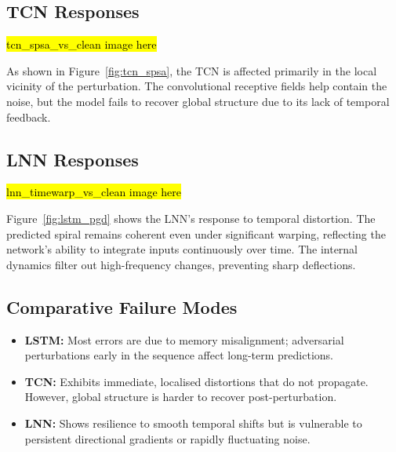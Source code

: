 \subsection{TCN Responses}

\hl{tcn\_spsa\_vs\_clean image here}


As shown in Figure~\ref{fig:tcn_spsa}, the TCN is affected primarily in the local vicinity of the perturbation. The convolutional receptive fields help contain the noise, but the model fails to recover global structure due to its lack of temporal feedback.

\subsection{LNN Responses}

\hl{lnn\_timewarp\_vs\_clean image here}


Figure~\ref{fig:lstm_pgd} shows the LNN's response to temporal distortion. The predicted spiral remains coherent even under significant warping, reflecting the network's ability to integrate inputs continuously over time. The internal dynamics filter out high-frequency changes, preventing sharp deflections.

\subsection{Comparative Failure Modes}

\begin{itemize}
    \item \textbf{LSTM:} Most errors are due to memory misalignment; adversarial perturbations early in the sequence affect long-term predictions.
    \item \textbf{TCN:} Exhibits immediate, localised distortions that do not propagate. However, global structure is harder to recover post-perturbation.
    \item \textbf{LNN:} Shows resilience to smooth temporal shifts but is vulnerable to persistent directional gradients or rapidly fluctuating noise.
\end{itemize}

